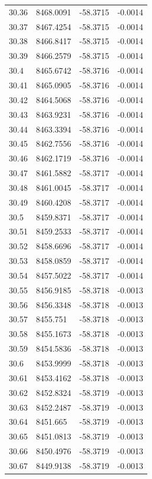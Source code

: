 \begin{table}[H]
\begin{tabular}{llll}
30.36 & 8468.0091 & -58.3715 & -0.0014 \\
30.37 & 8467.4254 & -58.3715 & -0.0014 \\
30.38 & 8466.8417 & -58.3715 & -0.0014 \\
30.39 & 8466.2579 & -58.3715 & -0.0014 \\
30.4 & 8465.6742 & -58.3716 & -0.0014 \\
30.41 & 8465.0905 & -58.3716 & -0.0014 \\
30.42 & 8464.5068 & -58.3716 & -0.0014 \\
30.43 & 8463.9231 & -58.3716 & -0.0014 \\
30.44 & 8463.3394 & -58.3716 & -0.0014 \\
30.45 & 8462.7556 & -58.3716 & -0.0014 \\
30.46 & 8462.1719 & -58.3716 & -0.0014 \\
30.47 & 8461.5882 & -58.3717 & -0.0014 \\
30.48 & 8461.0045 & -58.3717 & -0.0014 \\
30.49 & 8460.4208 & -58.3717 & -0.0014 \\
30.5 & 8459.8371 & -58.3717 & -0.0014 \\
30.51 & 8459.2533 & -58.3717 & -0.0014 \\
30.52 & 8458.6696 & -58.3717 & -0.0014 \\
30.53 & 8458.0859 & -58.3717 & -0.0014 \\
30.54 & 8457.5022 & -58.3717 & -0.0014 \\
30.55 & 8456.9185 & -58.3718 & -0.0013 \\
30.56 & 8456.3348 & -58.3718 & -0.0013 \\
30.57 & 8455.751 & -58.3718 & -0.0013 \\
30.58 & 8455.1673 & -58.3718 & -0.0013 \\
30.59 & 8454.5836 & -58.3718 & -0.0013 \\
30.6 & 8453.9999 & -58.3718 & -0.0013 \\
30.61 & 8453.4162 & -58.3718 & -0.0013 \\
30.62 & 8452.8324 & -58.3719 & -0.0013 \\
30.63 & 8452.2487 & -58.3719 & -0.0013 \\
30.64 & 8451.665 & -58.3719 & -0.0013 \\
30.65 & 8451.0813 & -58.3719 & -0.0013 \\
30.66 & 8450.4976 & -58.3719 & -0.0013 \\
30.67 & 8449.9138 & -58.3719 & -0.0013 \\

\end{tabular}
\end{table}
